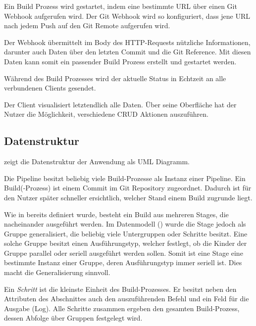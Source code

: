 Ein Build Prozess wird gestartet, indem eine bestimmte URL über einen Git Webhook aufgerufen wird. Der Git Webhook wird so konfiguriert, dass jene URL nach jedem Push auf den Git Remote aufgerufen wird.

Der Webhook übermittelt im Body des HTTP-Requests nützliche Informationen, darunter auch Daten über den letzten Commit und die Git Reference. Mit diesen Daten kann somit ein passender Build Prozess erstellt und gestartet werden.

Während des Build Prozesses wird der aktuelle Status in Echtzeit an alle verbundenen Clients gesendet.

Der Client visualisiert letztendlich alle Daten. Über seine Oberfläche hat der Nutzer die Möglichkeit, verschiedene \ac{CRUD} Aktionen auszuführen.

\subsection{Datenstruktur}
\label{subsec:uml}

 zeigt die Datenstruktur der Anwendung als UML Diagramm.

Die Pipeline besitzt beliebig viele Build-Prozesse als Instanz einer Pipeline. Ein Build(-Prozess) ist einem Commit im Git Repository zugeordnet. Dadurch ist für den Nutzer später schneller ersichtlich, welcher Stand einem Build zugrunde liegt.

Wie in  bereits definiert wurde, besteht ein Build aus mehreren Stages, die nacheinander ausgeführt werden. Im Datenmodell () wurde die Stage jedoch als Gruppe generalisiert, die beliebig viele Untergruppen oder Schritte besitzt. Eine solche Gruppe besitzt einen Ausführungstyp, welcher festlegt, ob die Kinder der Gruppe parallel oder seriell ausgeführt werden sollen. Somit ist eine Stage eine bestimmte Instanz einer Gruppe, deren Ausführungstyp immer seriell ist. Dies macht die Generalisierung sinnvoll.

Ein \emph{Schritt} ist die kleinste Einheit des Build-Prozesses. Er besitzt neben den Attributen des Abschnittes auch den auszuführenden Befehl und ein Feld für die Ausgabe (Log). Alle Schritte zusammen ergeben den gesamten Build-Prozess, dessen Abfolge über Gruppen festgelegt wird.

